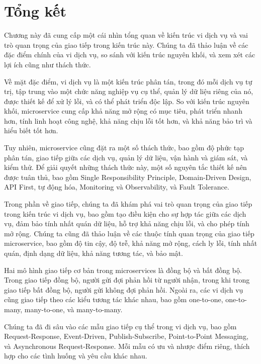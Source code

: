 \section{Tổng kết}

Chương này đã cung cấp một cái nhìn tổng quan về kiến trúc vi dịch vụ và vai trò quan trọng của giao tiếp trong kiến trúc này. Chúng ta đã thảo luận về các đặc điểm chính của vi dịch vụ, so sánh với kiến trúc nguyên khối, và xem xét các lợi ích cũng như thách thức.

Về mặt đặc điểm, vi dịch vụ là một kiến trúc phân tán, trong đó mỗi dịch vụ tự trị, tập trung vào một chức năng nghiệp vụ cụ thể, quản lý dữ liệu riêng của nó, được thiết kế để xử lý lỗi, và có thể phát triển độc lập. So với kiến trúc nguyên khối, microservice cung cấp khả năng mở rộng có mục tiêu, phát triển nhanh hơn, tính linh hoạt công nghệ, khả năng chịu lỗi tốt hơn, và khả năng bảo trì và hiểu biết tốt hơn.

Tuy nhiên, microservice cũng đặt ra một số thách thức, bao gồm độ phức tạp phân tán, giao tiếp giữa các dịch vụ, quản lý dữ liệu, vận hành và giám sát, và kiểm thử. Để giải quyết những thách thức này, một số nguyên tắc thiết kế nên được tuân thủ, bao gồm Single Responsibility Principle, Domain-Driven Design, API First, tự động hóa, Monitoring và Observability, và Fault Tolerance.

Trong phần về giao tiếp, chúng ta đã khám phá vai trò quan trọng của giao tiếp trong kiến trúc vi dịch vụ, bao gồm tạo điều kiện cho sự hợp tác giữa các dịch vụ, đảm bảo tính nhất quán dữ liệu, hỗ trợ khả năng chịu lỗi, và cho phép tính mở rộng. Chúng ta cũng đã thảo luận về các thuộc tính quan trọng của giao tiếp microservice, bao gồm độ tin cậy, độ trễ, khả năng mở rộng, cách ly lỗi, tính nhất quán, định dạng dữ liệu, khả năng tương tác, và bảo mật.

Hai mô hình giao tiếp cơ bản trong microservices là đồng bộ và bất đồng bộ. Trong giao tiếp đồng bộ, người gửi đợi phản hồi từ người nhận, trong khi trong giao tiếp bất đồng bộ, người gửi không đợi phản hồi. Ngoài ra, các vi dịch vụ cũng giao tiếp theo các kiểu tương tác khác nhau, bao gồm one-to-one, one-to-many, many-to-one, và many-to-many.

Chúng ta đã đi sâu vào các mẫu giao tiếp cụ thể trong vi dịch vụ, bao gồm Request-Response, Event-Driven, Publish-Subscribe, Point-to-Point Messaging, và Asynchronous Request-Response. Mỗi mẫu có ưu và nhược điểm riêng, thích hợp cho các tình huống và yêu cầu khác nhau.

